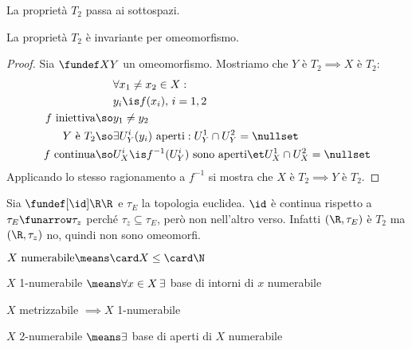 \begin{prop}
La proprietà $T_2$ passa ai sottospazi.
\end{prop}

\begin{prop}
La proprietà $T_2$ è invariante per omeomorfismo.
\end{prop}
\begin{proof}
Sia $\fundef XY$ un omeomorfismo. Mostriamo che $Y\text{ è }T_2\implies X\text{ è }T_2$:
\begin{align*}
&\forall x_1\neq x_2\in X:\\
&y_i\is f(x_i),\,i=1,2\\
f\text{ iniettiva}\so&y_1\neq y_2\\
Y\text{ è }T_2\so&\exists U_Y^i(y_i)\text{ aperti}:U_Y^1\cap U_Y^2=\nullset\\
f\text{ continua}\so&U_X^i\is f^{-1}(U_Y^i)\text{ sono aperti}\et U_X^1\cap U_X^2=\nullset
\end{align*}
Applicando lo stesso ragionamento a $f^{-1}$ si mostra che $X\text{ è }T_2\implies Y\text{ è }T_2$.
\end{proof}

\begin{es}
Sia $\fundef[\id]\R\R$ e $\tau_E$ la topologia euclidea. $\id$ è continua rispetto a $\tau_E\funarrow\tau_z$ perché $\tau_z\subseteq\tau_E$, però non nell'altro verso. Infatti $(\R,\tau_E)$ è $T_2$ ma $(\R,\tau_z)$ no, quindi non sono omeomorfi.
\end{es}

\begin{defn}[Numerabilità]
$X\text{ numerabile}\means\card X\leq\card\N$
\end{defn}

\begin{defn}
$X$ 1-numerabile $\means\forall x\in X\,\exists$ base di intorni di $x$ numerabile
\end{defn}

\begin{prop}
$X$ metrizzabile $\implies X$ 1-numerabile
\end{prop}

\begin{defn}
$X$ 2-numerabile $\means\exists$ base di aperti di $X$ numerabile
\end{defn}
